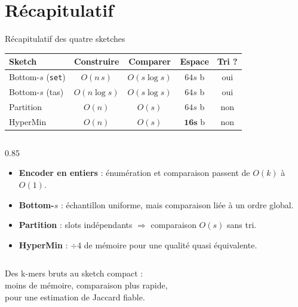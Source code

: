 \documentclass[aspectratio=169,11pt]{beamer}
\begin{document}
\section{Récapitulatif}

\begin{frame}{Récapitulatif des quatre sketches}
  \centering
  \small
  \begin{tabular}{lcccc}
    \toprule
    \textbf{Sketch} & \textbf{Construire} & \textbf{Comparer} & \textbf{Espace} & \textbf{Tri ?} \\
    \midrule
    Bottom-$s$ (\texttt{set}) & $O(n\,s)$      & $O(s\log s)$ & $64s$ b & oui \\
    Bottom-$s$ (tas)          & $O(n\log s)$   & $O(s\log s)$ & $64s$ b & oui \\
    Partition                 & $O(n)$         & $O(s)$       & $64s$ b & non \\
    \rowcolor{cGreen!15}
    HyperMin                  & $O(n)$         & $O(s)$       & $\mathbf{16s}$ b & non \\
    \bottomrule
  \end{tabular}

  \vfill
  \begin{columns}
    \begin{column}{0.85\textwidth}
      \footnotesize
      \begin{itemize}
        \item \textbf{Encoder en entiers} : énumération et comparaison passent de $O(k)$ à $O(1)$.
        \item \textbf{Bottom-$s$} : échantillon uniforme, mais comparaison liée à un ordre global.
        \item \textbf{Partition} : slots indépendants $\Rightarrow$ comparaison $O(s)$ sans tri.
        \item \textbf{HyperMin} : $\div 4$ de mémoire pour une qualité quasi équivalente.
      \end{itemize}
    \end{column}
  \end{columns}
\end{frame}

\begin{frame}[standout]
  Des k-mers bruts au sketch compact :\\
  \alert{moins de mémoire}, \alert{comparaison plus rapide},\\
  pour une estimation de Jaccard fiable.
\end{frame}
\end{document}
